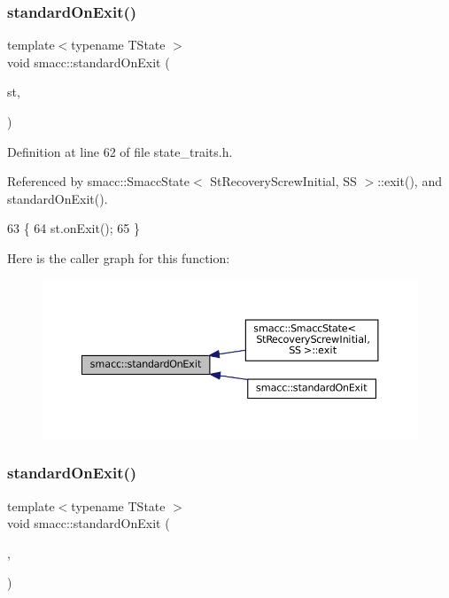 \subsubsection{\texorpdfstring{standard\+On\+Exit()}{standardOnExit()}\hspace{0.1cm}{\footnotesize\ttfamily [1/3]}}
{\footnotesize\ttfamily template$<$typename T\+State $>$ \\
void smacc\+::standard\+On\+Exit (\begin{DoxyParamCaption}\item[{T\+State \&}]{st,  }\item[{std\+::true\+\_\+type}]{ }\end{DoxyParamCaption})}



Definition at line 62 of file state\+\_\+traits.\+h.



Referenced by smacc\+::\+Smacc\+State$<$ St\+Recovery\+Screw\+Initial, S\+S $>$\+::exit(), and standard\+On\+Exit().


\begin{DoxyCode}
63     \{
64         st.onExit();
65     \}
\end{DoxyCode}
Here is the caller graph for this function\+:
\nopagebreak
\begin{figure}[H]
\begin{center}
\leavevmode
\includegraphics[width=350pt]{namespacesmacc_ab3aebd999834404be47a62ea03aacfc9_icgraph}
\end{center}
\end{figure}
\mbox{\label{namespacesmacc_a17d9a98b5ae8bbeea7dc632105731e25}} 
\subsubsection{\texorpdfstring{standard\+On\+Exit()}{standardOnExit()}\hspace{0.1cm}{\footnotesize\ttfamily [2/3]}}
{\footnotesize\ttfamily template$<$typename T\+State $>$ \\
void smacc\+::standard\+On\+Exit (\begin{DoxyParamCaption}\item[{T\+State \&}]{,  }\item[{std\+::false\+\_\+type}]{ }\end{DoxyParamCaption})}



